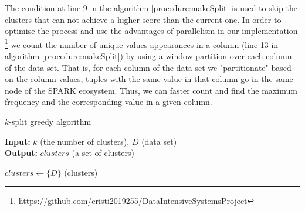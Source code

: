 The condition at line 9 in the algorithm \ref{procedure:makeSplit} is used to skip the clusters that can not achieve a higher score than the current one. In order to optimise the process and use the advantages of parallelism in our implementation \footnote{\href{https://github.com/cristi2019255/DataIntensiveSystemsProject}{https://github.com/cristi2019255/DataIntensiveSystemsProject}} we count the number of unique values appearances in a column (line 13 in algorithm \ref{procedure:makeSplit}) by using a window partition over each column of the data set. That is, for each column of the data set we "partitionate" based on the column values, tuples with the same value in that column go in the same node of the SPARK ecosystem. Thus, we can faster count and find the maximum frequency and the corresponding value in a given column. 

\begin{algorithm}
{\fontsize{8.2pt}{10pt}\selectfont
\caption{$k$-split greedy algorithm}
\label{Pseudocode:CustomTechnique}
\hspace*{\algorithmicindent} \textbf{Input:} $k$ (the number of clusters), $D$ (data set) \\
\hspace*{\algorithmicindent} \textbf{Output:} $clusters$ (a set of clusters)
\begin{algorithmic}[1]
\State $clusters \gets \{D\}$
    \State {}(clusters)
\EndFor
\end{algorithmic}
}
\end{algorithm}

